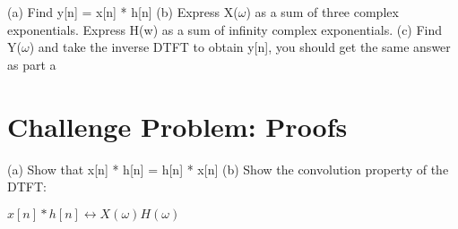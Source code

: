 \documentclass[11pt]{article}
\begin{document}
\vspace{4mm}

(a) Find y[n] = x[n] * h[n]\newline
(b) Express X($\omega$) as a sum of three complex exponentials. Express H(w) as a sum of infinity complex exponentials.\newline
(c) Find Y($\omega$) and take the inverse DTFT to obtain y[n], you should get the same answer as part a


\section{Challenge Problem: Proofs}

(a) Show that x[n] * h[n] = h[n] * x[n]\newline
(b) Show the convolution property of the DTFT:



\begin{center}

$ 
x[n] * h[n] \longleftrightarrow X(\omega) H(\omega)
$
\end{center}
\end{document}

